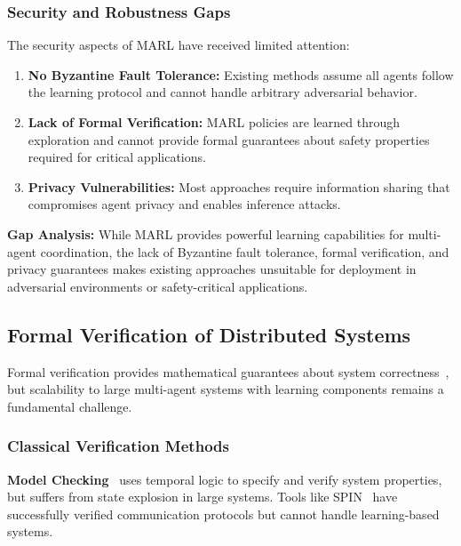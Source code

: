 \documentclass[conference]{IEEEtran}
\begin{document}
\subsubsection{Security and Robustness Gaps}

The security aspects of MARL have received limited attention:

\begin{enumerate}
    \item \textbf{No Byzantine Fault Tolerance:} Existing methods assume all agents follow the learning protocol and cannot handle arbitrary adversarial behavior.
    
    \item \textbf{Lack of Formal Verification:} MARL policies are learned through exploration and cannot provide formal guarantees about safety properties required for critical applications.
    
    \item \textbf{Privacy Vulnerabilities:} Most approaches require information sharing that compromises agent privacy and enables inference attacks.
\end{enumerate}

\textbf{Gap Analysis:} While MARL provides powerful learning capabilities for multi-agent coordination, the lack of Byzantine fault tolerance, formal verification, and privacy guarantees makes existing approaches unsuitable for deployment in adversarial environments or safety-critical applications.

\subsection{Formal Verification of Distributed Systems}

Formal verification provides mathematical guarantees about system correctness~\cite{clarke1999model}, but scalability to large multi-agent systems with learning components remains a fundamental challenge.

\subsubsection{Classical Verification Methods}

\textbf{Model Checking}~\cite{clarke1999model} uses temporal logic to specify and verify system properties, but suffers from state explosion in large systems. Tools like SPIN~\cite{holzmann2003spin} have successfully verified communication protocols but cannot handle learning-based systems.
\end{document}
